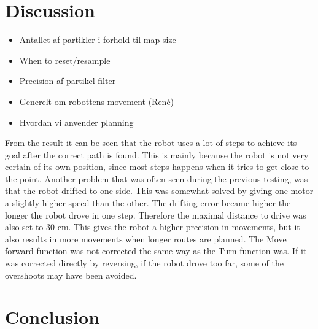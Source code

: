 \chapter{Discussion}
\begin{itemize}
\item Antallet af partikler i forhold til map size
\item When to reset/resample
\item Precision af partikel filter
\item Generelt om robottens movement (René)
\item Hvordan vi anvender planning
\end{itemize}

From the result it can be seen that the robot uses a lot of steps to achieve its goal after the correct path is found. This is mainly because the robot is not very certain of its own position, since most steps happens when it tries to get close to the point. 
Another problem that was often seen during the previous testing, was that the robot drifted to one side. This was somewhat solved by giving one motor a slightly higher speed than the other. The drifting error became higher the longer the robot drove in one step. Therefore the maximal distance to drive was also set to 30 cm. This gives the robot a higher precision in movements, but it also results in more movements when longer routes are planned.
The Move forward function was not corrected the same way as the Turn function was. If it was corrected directly by reversing, if the robot drove too far, some of the overshoots may have been avoided.

\chapter{Conclusion}
